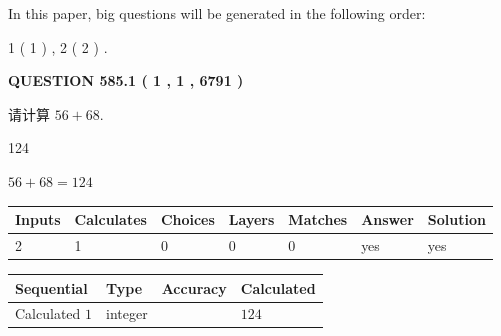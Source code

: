 \documentclass{ctexart}
\begin{document}
   
   
\vspace{0.2in}
   
In this paper, big questions will be generated in the following order: 
   
   
   1 ( 1 )
 ,
   2 ( 2 )
 .
  
\vspace{0.2in}
  
{\textbf{\Large{QUESTION
585.1 
 ( 1 , 1 , 6791 )
}}}
  
  
 
请计算 $ %
56 +  %
68 $.
 
 
 
\noindent{}
 
 

124
 
 
\noindent{}
 
 

 
 
 
\noindent{}
 
 

$ %
56 +  %
68=   %
124$
 
 
\noindent{}
 
 

 
   
   
   
   
\noindent\begin{tabular}{|l|l|l|l|l|l|l|}
 \hline
Inputs & Calculates & Choices & Layers & Matches & Answer & Solution \\ \hline
 2  & 
 1  & 
 0
  & 
 0  & 
 0  & 
  yes & 
  yes 
  \\ \hline
 \end{tabular}
   
   
   
   
\noindent{}
   
   
  
  
\noindent\begin{tabular}{|l|l|l|l|}
\hline
 Sequential & Type & Accuracy & Calculated \\ 
\hline
 
 
  Calculated $  1 $ & integer &  & 
  $ 124 $ 
 \\  \hline  
 \end{tabular}
   
\end{document}

